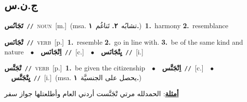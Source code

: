 \documentclass[10pt,a4paper,twoside]{article} %
\begin{document}
\begin{multicols}{2}
\vspace{-3mm}
\subsection*{\color{blue}\foreignlanguage{arabic}{ج.ن.س}\color{blue}{}} 

{\setlength\topsep{0pt}\textbf{\foreignlanguage{arabic}{تَجَانُس}}\ {\color{gray}\texttt{//}\color{black}}\ \textsc{noun}\ [m.]\ \color{gray}(msa. \foreignlanguage{arabic}{تشابُه}~\foreignlanguage{arabic}{\textbf{٢.}}  \foreignlanguage{arabic}{تَناغُم}~\foreignlanguage{arabic}{\textbf{١.}})\color{black}\ \textbf{1.}~harmony  \textbf{2.}~resemblance\ } \vspace{2mm}

{\setlength\topsep{0pt}\textbf{\foreignlanguage{arabic}{تْجَانَس}}\ {\color{gray}\texttt{//}\color{black}}\ \textsc{verb}\ [p.]\ \textbf{1.}~resemble  \textbf{2.}~go in line with.  \textbf{3.}~be of the same kind and nature\ \ $\bullet$\ \ \setlength\topsep{0pt}\textbf{\foreignlanguage{arabic}{اِتْجَانَس}}\ {\color{gray}\texttt{//}\color{black}}\ [c.]\ \ $\bullet$\ \ \setlength\topsep{0pt}\textbf{\foreignlanguage{arabic}{يِتْجَانَس}}\ {\color{gray}\texttt{//}\color{black}}\ [i.]\ } \vspace{2mm}

{\setlength\topsep{0pt}\textbf{\foreignlanguage{arabic}{تْجَنَّس}}\ {\color{gray}\texttt{//}\color{black}}\ \textsc{verb}\ [p.]\ \textbf{1.}~be given the citizenship\ \ $\bullet$\ \ \setlength\topsep{0pt}\textbf{\foreignlanguage{arabic}{اِتْجَنَّس}}\ {\color{gray}\texttt{//}\color{black}}\ [c.]\ \ $\bullet$\ \ \setlength\topsep{0pt}\textbf{\foreignlanguage{arabic}{يِتْجَنَّس}}\ {\color{gray}\texttt{//}\color{black}}\ [i.]\ \color{gray}(msa. \foreignlanguage{arabic}{يحصل على الجنسيَّة}~\foreignlanguage{arabic}{\textbf{١.}})\color{black}\  \begin{flushright}\color{gray}\foreignlanguage{arabic}{\textbf{\underline{\foreignlanguage{arabic}{أمثلة}}}: الحمدلله مرتي تْجَنَّست أردني العام وأطلعتلها جواز سفر}\end{flushright}\color{black}} \vspace{2mm}


\end{multicols}
\end{document}
